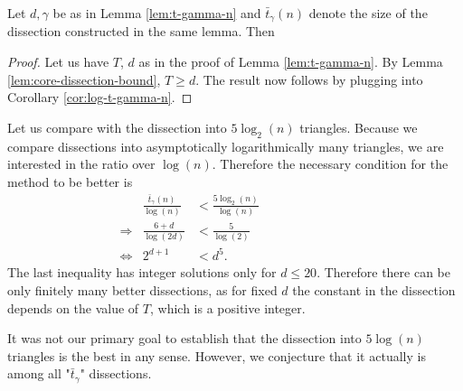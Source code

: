 \begin{lem} Let $d,\gamma$ be as in Lemma \ref{lem:t-gamma-n} and $\bar t_\gamma(n)$ denote the size of the dissection constructed in the same lemma. Then
\end{lem}%
\begin{proof}
Let us have $T$, $d$ as in the proof of Lemma \ref{lem:t-gamma-n}. By Lemma \ref{lem:core-dissection-bound}, $T \geq d$. The result now follows by plugging into Corollary \ref{cor:log-t-gamma-n}.
\end{proof}

Let us compare with the dissection into $5 \log_2(n)$ triangles. Because we compare dissections into asymptotically logarithmically many triangles, we are interested in the ratio over $\log(n)$. Therefore the necessary condition for the method to be better is
\begin{align}
	& &\frac{\bar t_\gamma(n)}{\log (n)} &< \frac{5 \log_2(n)}{\log(n)} \hspace{8em} \\
	&\Rightarrow & \frac{6+d}{\log(2d)} &< \frac{5}{\log(2)} \\
	&\Leftrightarrow &  2 ^ {d+1} &< d^5.
\end{align}
The last inequality has integer solutions only for $d \leq 20$. Therefore there can be only finitely many better dissections, as for fixed $d$ the constant in the dissection depends on the value of $T$, which is a positive integer.

It was not our primary goal to establish that the dissection into $5 \log(n)$ triangles is the best in any sense. However, we conjecture that it actually is among all "$\bar t_\gamma$" dissections.




